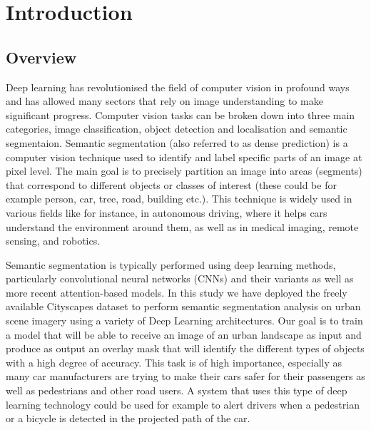 \section{Introduction}
\subsection{Overview}

Deep learning has revolutionised the field of computer vision in profound ways and has allowed many sectors that rely on image understanding to make significant progress. Computer vision tasks can be broken down into three main categories, image classification, object detection and localisation and semantic segmentaion. Semantic segmentation (also referred to as dense prediction) is a computer vision technique used to identify and label specific parts of an image at pixel level. The main goal is to precisely partition an image into areas (segments) that correspond to different objects or classes of interest (these could be for example person, car, tree, road, building etc.). This technique is widely used in various fields like for instance, in autonomous driving, where it helps cars understand the  environment around them, as well as in medical imaging, remote sensing, and robotics. 

Semantic segmentation is typically performed using deep learning methods, particularly convolutional neural networks (CNNs) and their variants as well as more recent attention-based models. In this study we have deployed the freely available Cityscapes dataset \cite{DBLP:journals/corr/CordtsORREBFRS16} to perform semantic segmentation analysis on urban scene imagery using a variety of Deep Learning architectures. Our goal is to train a model that will be able to receive an image of an urban landscape as input and produce as output an overlay mask that will identify the different types of objects with a high degree of accuracy. This task is of high importance, especially as many car manufacturers are trying to make their cars safer for their passengers as well as pedestrians and other road users. A system that uses this type of deep learning technology could be used for example to alert drivers when a pedestrian or a bicycle is detected in the projected path of the car. 
